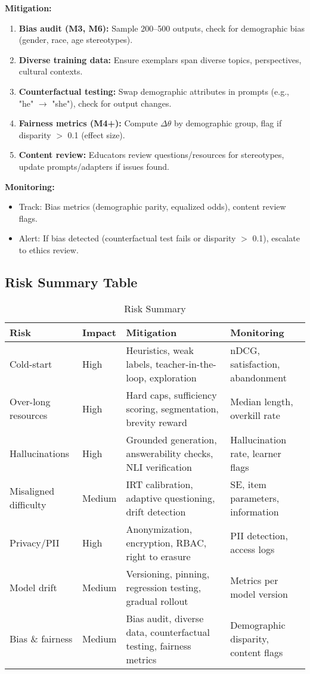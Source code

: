 \documentclass[11pt,letterpaper]{article}
\begin{document}
\textbf{Mitigation:}
\begin{enumerate}
\item \textbf{Bias audit (M3, M6):} Sample 200--500 outputs, check for demographic bias (gender, race, age stereotypes).
\item \textbf{Diverse training data:} Ensure exemplars span diverse topics, perspectives, cultural contexts.
\item \textbf{Counterfactual testing:} Swap demographic attributes in prompts (e.g., "he" $\rightarrow$ "she"), check for output changes.
\item \textbf{Fairness metrics (M4+):} Compute $\Delta\theta$ by demographic group, flag if disparity $>$ 0.1 (effect size).
\item \textbf{Content review:} Educators review questions/resources for stereotypes, update prompts/adapters if issues found.
\end{enumerate}

\textbf{Monitoring:}
\begin{itemize}
\item Track: Bias metrics (demographic parity, equalized odds), content review flags.
\item Alert: If bias detected (counterfactual test fails or disparity $>$ 0.1), escalate to ethics review.
\end{itemize}

\subsection{Risk Summary Table}\label{subsec:risk-summary}

\begin{table}[H]
\centering
\small
\begin{tabular}{@{}p{3cm}p{2cm}p{5cm}p{4cm}@{}}
\toprule
\textbf{Risk} & \textbf{Impact} & \textbf{Mitigation} & \textbf{Monitoring} \\
\midrule
Cold-start & High & Heuristics, weak labels, teacher-in-the-loop, exploration & nDCG, satisfaction, abandonment \\
Over-long resources & High & Hard caps, sufficiency scoring, segmentation, brevity reward & Median length, overkill rate \\
Hallucinations & High & Grounded generation, answerability checks, NLI verification & Hallucination rate, learner flags \\
Misaligned difficulty & Medium & IRT calibration, adaptive questioning, drift detection & SE, item parameters, information \\
Privacy/PII & High & Anonymization, encryption, RBAC, right to erasure & PII detection, access logs \\
Model drift & Medium & Versioning, pinning, regression testing, gradual rollout & Metrics per model version \\
Bias \& fairness & Medium & Bias audit, diverse data, counterfactual testing, fairness metrics & Demographic disparity, content flags \\
\bottomrule
\end{tabular}
\caption{Risk Summary}
\end{table}
\end{document}
